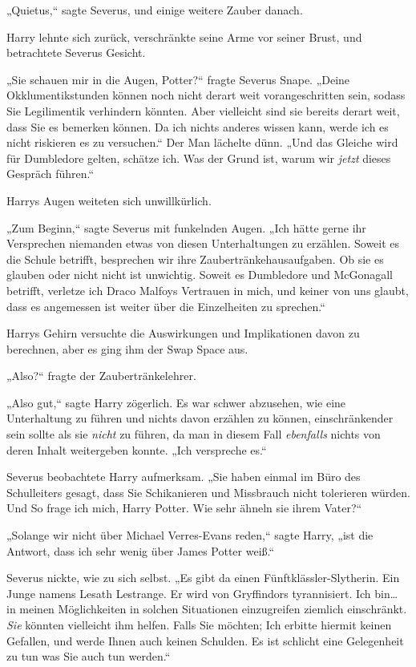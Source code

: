 {„Quietus,“ sagte Severus, und einige weitere Zauber danach.

Harry lehnte sich zurück, verschränkte seine Arme vor seiner Brust, und betrachtete Severus Gesicht.

„Sie schauen mir in die Augen, Potter?“ fragte Severus Snape. „Deine Okklumentikstunden können noch nicht derart weit vorangeschritten sein, sodass Sie Legilimentik verhindern könnten. Aber vielleicht sind sie bereits derart weit, dass Sie es bemerken können. Da ich nichts anderes wissen kann, werde ich es nicht riskieren es zu versuchen.“ Der Man lächelte dünn. „Und das Gleiche wird für Dumbledore gelten, schätze ich. Was der Grund ist, warum wir \emph{jetzt} dieses Gespräch führen.“

Harrys Augen weiteten sich unwillkürlich.

„Zum Beginn,“ sagte Severus mit funkelnden Augen. „Ich hätte gerne ihr Versprechen niemanden etwas von diesen Unterhaltungen zu erzählen. Soweit es die Schule betrifft, besprechen wir ihre Zaubertränkehausaufgaben. Ob sie es glauben oder nicht nicht ist unwichtig. Soweit es Dumbledore und McGonagall betrifft, verletze ich Draco Malfoys Vertrauen in mich, und keiner von uns glaubt, dass es angemessen ist weiter über die Einzelheiten zu sprechen.“

Harrys Gehirn versuchte die Auswirkungen und Implikationen davon zu berechnen, aber es ging ihm der Swap Space aus.

„Also?“ fragte der Zaubertränkelehrer.

„Also gut,“ sagte Harry zögerlich. Es war schwer abzusehen, wie eine Unterhaltung zu führen und nichts davon erzählen zu können, einschränkender sein sollte als sie \emph{nicht} zu führen, da man in diesem Fall \emph{ebenfalls} nichts von deren Inhalt weitergeben konnte. „Ich verspreche es.“

Severus beobachtete Harry aufmerksam. „Sie haben einmal im Büro des Schulleiters gesagt, dass Sie Schikanieren und Missbrauch nicht tolerieren würden. Und So frage ich mich, Harry Potter. Wie sehr ähneln sie ihrem Vater?“

„Solange wir nicht über Michael Verres-Evans reden,“ sagte Harry, „ist die Antwort, dass ich sehr wenig über James Potter weiß.“

Severus nickte, wie zu sich selbst. „Es gibt da einen Fünftklässler-Slytherin. Ein Junge namens Lesath Lestrange. Er wird von Gryffindors tyrannisiert. Ich bin… in meinen Möglichkeiten in solchen Situationen einzugreifen ziemlich einschränkt. \emph{Sie} könnten vielleicht ihm helfen. Falls Sie möchten; Ich erbitte hiermit keinen Gefallen, und werde Ihnen auch keinen Schulden. Es ist schlicht eine Gelegenheit zu tun was Sie auch tun werden.“

}
